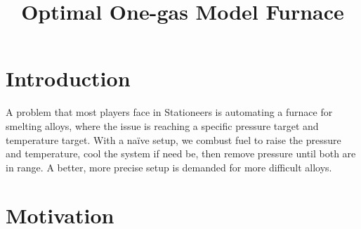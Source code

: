 \documentclass{article}
\begin{document}
\title{Optimal One-gas Model Furnace}
\maketitle

\tableofcontents

\section{Introduction}

A problem that most players face in Stationeers is automating a furnace
for smelting alloys, where the issue is reaching a specific pressure target
and temperature target. With a naïve setup, we combust fuel to raise the
pressure and temperature, cool the system if need be, then remove pressure
until both are in range. A better, more precise setup is demanded for
more difficult alloys.

\section{Motivation}
\end{document}
